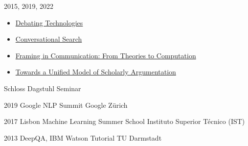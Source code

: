 

\cvevent
{2015, 2019, 2022} %
{
\vspace{-20px}
\begin{itemize}
    \item \href{https://www.dagstuhl.de/de/programm/kalender/semhp/?semnr=15512}{Debating Technologies}
\item \href{https://www.dagstuhl.de/en/program/calendar/semhp/?semnr=19461}{Conversational Search}
\item \href{https://www.dagstuhl.de/de/programm/kalender/semhp/?semnr=22131}{Framing in Communication: From Theories to Computation
} \item \href{https://www.dagstuhl.de/de/seminars/seminar-calendar/seminar-details/22432}{Towards a Unified Model of Scholarly Argumentation
} 
\end{itemize}
\vspace{15px}
}%
{Schloss Dagstuhl Seminar} %

\cvevent
{2019} %
{Google NLP Summit}  %
{Google Zürich} %

\cvevent
{2017} %
{Lisbon Machine Learning Summer School} %
{Instituto Superior Técnico (IST)} %

\cvevent
{2013} %
{DeepQA, IBM Watson Tutorial} %
{TU Darmstadt} %


